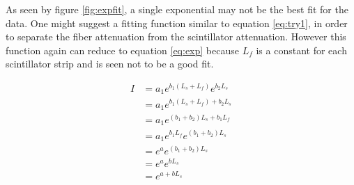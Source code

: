 As seen by figure \ref{fig:expfit}, a single exponential may not be the best fit for the data.
One might suggest a fitting function similar to equation \ref{eq:try1}, in order to separate the fiber 
attenuation from the scintillator attenuation.
However this function again can reduce to equation \ref{eq:exp} because $L_{f}$ is a constant for each 
scintillator strip and is seen not to be a good fit.


\begin{equation}
    \begin{split}
        I &= a_{1}e^{b_{1}(L_{s} + L_{f})}e^{b_{2}L_{s}} \\
          &= a_{1}e^{b_{1}(L_{s} + L_{f}) + b_{2}L_{s}} \\
          &= a_{1}e^{(b_{1} + b_{2})L_{s} + b_{1}L_{f}} \\
          &= a_{1}e^{b_{1}L_{f}}e^{(b_{1} + b_{2})L_{s}} \\
          &= e^{a}e^{(b_{1} + b_{2})L_{s}} \\
          &= e^{a}e^{bL_{s}} \\
          &= e^{a + bL_{s}} \\
    \end{split}
    \label{eq:try1}
\end{equation}

\FloatBarrier


